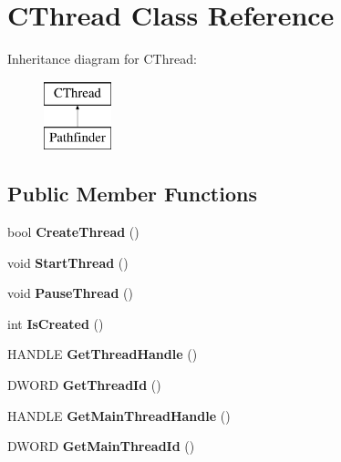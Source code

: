 \hypertarget{class_c_thread}{\section{C\-Thread Class Reference}
\label{class_c_thread}
}
Inheritance diagram for C\-Thread\-:\begin{figure}[H]
\begin{center}
\leavevmode
\includegraphics[height=2.000000cm]{class_c_thread}
\end{center}
\end{figure}
\subsection*{Public Member Functions}
\begin{DoxyCompactItemize}
\item 
\hypertarget{class_c_thread_a98db063e6cd811eb24a523da0fabcd57}{bool {\bfseries Create\-Thread} ()}\label{class_c_thread_a98db063e6cd811eb24a523da0fabcd57}

\item 
\hypertarget{class_c_thread_a10d088b7a6ba6458eaab913b1f0f125d}{void {\bfseries Start\-Thread} ()}\label{class_c_thread_a10d088b7a6ba6458eaab913b1f0f125d}

\item 
\hypertarget{class_c_thread_a7e07c7d7e91be53c57c21ecd23be4732}{void {\bfseries Pause\-Thread} ()}\label{class_c_thread_a7e07c7d7e91be53c57c21ecd23be4732}

\item 
\hypertarget{class_c_thread_a5b91416d9727cf222332772e153d9496}{int {\bfseries Is\-Created} ()}\label{class_c_thread_a5b91416d9727cf222332772e153d9496}

\item 
\hypertarget{class_c_thread_a2c7f2ed1b4d713afde51590d383308ba}{H\-A\-N\-D\-L\-E {\bfseries Get\-Thread\-Handle} ()}\label{class_c_thread_a2c7f2ed1b4d713afde51590d383308ba}

\item 
\hypertarget{class_c_thread_a7c9b3e1310c0fcb43d1fcb356c7bd317}{D\-W\-O\-R\-D {\bfseries Get\-Thread\-Id} ()}\label{class_c_thread_a7c9b3e1310c0fcb43d1fcb356c7bd317}

\item 
\hypertarget{class_c_thread_a7a8c4e192482147a99a28133d6093703}{H\-A\-N\-D\-L\-E {\bfseries Get\-Main\-Thread\-Handle} ()}\label{class_c_thread_a7a8c4e192482147a99a28133d6093703}

\item 
\hypertarget{class_c_thread_aef6f5eb4d12b681027399acc5fbddc31}{D\-W\-O\-R\-D {\bfseries Get\-Main\-Thread\-Id} ()}\label{class_c_thread_aef6f5eb4d12b681027399acc5fbddc31}

\end{DoxyCompactItemize}
